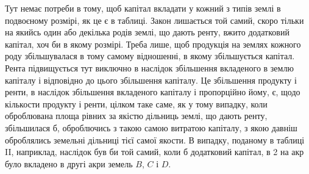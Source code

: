 Тут немає потреби в тому, щоб капітал вкладати у кожний з типів землі
в подвоєному розмірі, як це є в таблиці. Закон лишається той самий, скоро
тільки на якийсь один або декілька родів землі, що дають ренту, вжито додатковий капітал, хоч би в
якому розмірі. Треба лише, щоб продукція на землях
кожного роду збільшувалася в тому самому відношенні, в якому збільшується
капітал. Рента підвищується тут виключно в наслідок збільшення вкладеного
в землю капіталу і відповідно до цього збільшення капіталу. Це збільшення
продукту і ренти, в наслідок збільшення вкладеного капіталу і пропорційно
йому, є,  щодо кількости продукту і ренти, цілком таке саме, як у тому випадку,
коли оброблювана площа рівних за якістю дільниць землі, що дають ренту,
збільшилася б, оброблючись з такою самою витратою капіталу, з якою давніш оброблялись земельні
дільниці тієї самої якости. В випадку, поданому в таблиці II, наприклад, наслідок був би той самий,
коли б додатковий капітал,
в 2 на акр було вкладено в другі акри земель $B$, $C$ і $D$.
